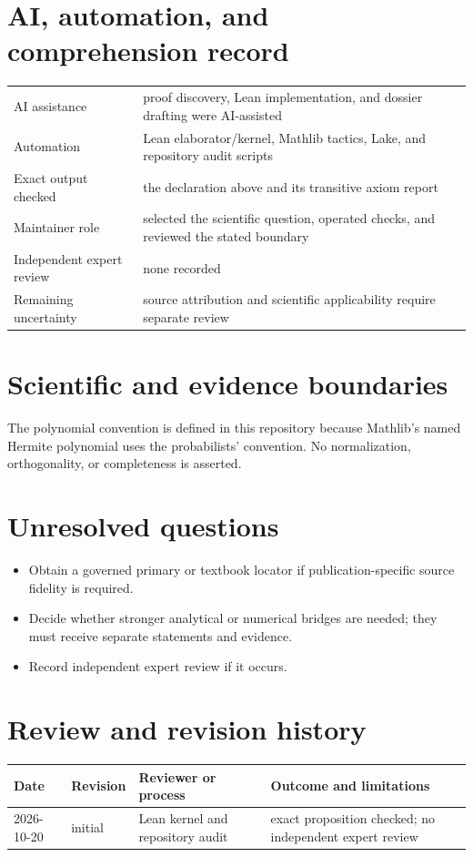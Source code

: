 \documentclass[11pt]{article}
\begin{document}
\section{AI, automation, and comprehension record}
\begin{tabularx}{\textwidth}{@{}lY@{}}\toprule
AI assistance & proof discovery, Lean implementation, and dossier drafting were AI-assisted \\
Automation & Lean elaborator/kernel, Mathlib tactics, Lake, and repository audit scripts \\
Exact output checked & the declaration above and its transitive axiom report \\
Maintainer role & selected the scientific question, operated checks, and reviewed the stated boundary \\
Independent expert review & none recorded \\
Remaining uncertainty & source attribution and scientific applicability require separate review \\
\bottomrule\end{tabularx}

\section{Scientific and evidence boundaries}
The polynomial convention is defined in this repository because Mathlib's named Hermite polynomial uses the probabilists' convention. No normalization, orthogonality, or completeness is asserted.

\section{Unresolved questions}
\begin{itemize}
\item Obtain a governed primary or textbook locator if publication-specific source fidelity is required.
\item Decide whether stronger analytical or numerical bridges are needed; they must receive separate statements and evidence.
\item Record independent expert review if it occurs.
\end{itemize}

\section{Review and revision history}
\begin{tabularx}{\textwidth}{@{}lllX@{}}\toprule
Date & Revision & Reviewer or process & Outcome and limitations \\
\midrule
2026-10-20 & initial & Lean kernel and repository audit & exact proposition checked; no independent expert review \\
\bottomrule\end{tabularx}
\end{document}
